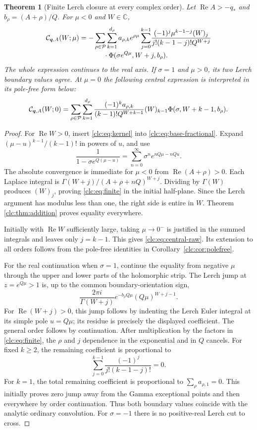 \documentclass[11pt,a4paper]{article}
\numberwithin{equation}{section}
\newtheorem{theorem}{Theorem}[section]
\theoremstyle{definition}\newtheorem{definition}[theorem]{Definition}
\theoremstyle{remark}\newtheorem{remark}[theorem]{Remark}
\DeclareMathOperator{\Rea}{Re}
\newcommand{\C}{\mathbb C}\newcommand{\R}{\mathbb R}\newcommand{\N}{\mathbb N}
\newcommand{\bq}{\boldsymbol q}\newcommand{\bs}{\boldsymbol s}
\newcommand{\CC}{\mathcal C}\newcommand{\UU}{\mathcal U}\newcommand{\EE}{\mathcal E}
\begin{document}
\begin{theorem}[Finite Lerch closure at every complex order]
\label{clc:thm:finite}
Let $\Rea A>-q_*$ and $b_\rho=(A+\rho)/Q$. For $\mu<0$ and $W\in\C$,
\begin{align}
 \CC_{\bq,A}(W;\mu)
 =-\sum_{\rho\in\PP}\sum_{k=1}^{d_\rho}a_{\rho,k}e^{\rho\mu}
 \sum_{j=0}^{k-1}
 &\frac{(-1)^j\mu^{k-1-j}(W)_j}
 {j!(k-1-j)!Q^{W+j}}\notag\\[-2pt]
 &\hspace{-24mm}\cdot\Phi(\sigma e^{Q\mu},W+j,b_\rho).
 \label{clc:eq:finite}
\end{align}
The whole expression continues to the real axis. If $\sigma=1$ and
$\mu>0$, its two Lerch boundary values agree. At $\mu=0$ the following
central expression is interpreted in its pole-free form below:
\begin{equation}\label{clc:eq:central-raw}
 \CC_{\bq,A}(W;0)=
 \sum_{\rho\in\PP}\sum_{k=1}^{d_\rho}
 \frac{(-1)^ka_{\rho,k}}{(k-1)!Q^{W+k-1}}
 (W)_{k-1}\Phi(\sigma,W+k-1,b_\rho).
\end{equation}
\end{theorem}
\begin{proof}
For $\Rea W>0$, insert \eqref{clc:eq:kernel} into
\eqref{clc:eq:base-fractional}. Expand
$(\mu-u)^{k-1}/(k-1)!$ in powers of $u$, and use
\[
 \frac1{1-\sigma e^{Q(\mu-u)}}
 =\sum_{n=0}^\infty\sigma^ne^{nQ\mu-nQu}.
\]
The absolute convergence is immediate for $\mu<0$ from
$\Rea(A+\rho)>0$. Each Laplace integral is
$\Gamma(W+j)/(A+\rho+nQ)^{W+j}$.
Dividing by $\Gamma(W)$ produces $(W)_j$, proving
\eqref{clc:eq:finite} in the initial half-plane. Since the Lerch argument
has modulus less than one, the right side is entire in $W$. Theorem
\ref{clc:thm:addition} proves equality everywhere.

Initially with $\Rea W$ sufficiently large, taking $\mu\to0^-$ is
justified in the summed integrals and leaves only $j=k-1$. This gives
\eqref{clc:eq:central-raw}. Its extension to all orders follows from
the pole-free identities in Corollary~\ref{clc:cor:polefree}.

For the real continuation when $\sigma=1$, continue the equality from
negative $\mu$ through the upper and lower parts of the holomorphic
strip. The Lerch jump at
$z=e^{Q\mu}>1$ is, up to the common boundary-orientation sign,
\[
 \frac{2\pi i}{\Gamma(W+j)}
 e^{-b_\rho Q\mu}(Q\mu)^{W+j-1}.
\]
For $\Rea(W+j)>0$, this jump follows by indenting the Lerch Euler
integral at its simple pole $u=Q\mu$; its residue is precisely the
displayed coefficient. The general order follows by continuation.
After multiplication by the factors in \eqref{clc:eq:finite}, the
$\rho$ and $j$ dependence in the exponential and in $Q$ cancels.
For fixed $k\ge2$, the remaining coefficient is proportional to
\[
 \sum_{j=0}^{k-1}\frac{(-1)^j}{j!(k-1-j)!}=0.
\]
For $k=1$, the total remaining coefficient is proportional to
$\sum_\rho a_{\rho,1}=0$. This initially proves zero jump away from
the Gamma exceptional points and then everywhere by order continuation.
Thus both boundary values coincide with the analytic ordinary
convolution. For $\sigma=-1$ there is no positive-real Lerch cut to cross.
\end{proof}
\end{document}
